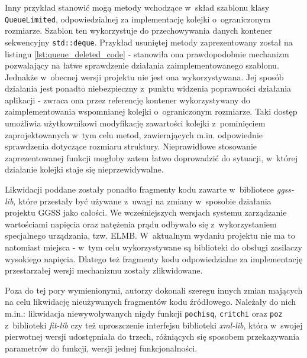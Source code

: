 


Inny przykład stanowić mogą metody wchodzące w~skład szablonu klasy \lstinline{QueueLimited}, odpowiedzialnej za implementację kolejki o~ograniczonym rozmiarze. Szablon ten wykorzystuje do przechowywania danych kontener sekwencyjny \lstinline{std::deque}. Przykład usuniętej metody zaprezentowany został na listingu \ref{lst:queue_deleted_code} - stanowiła ona prawdopodobnie mechanizm pozwalający na łatwe sprawdzenie działania zaimplementowanego szablonu. Jednakże w~obecnej wersji projektu nie jest ona wykorzystywana. Jej sposób działania jest ponadto niebezpieczny z~punktu widzenia poprawności działania aplikacji - zwraca ona przez referencję kontener wykorzystywany do zaimplementowania wspomnianej kolejki o~ograniczonym rozmiarze. Taki dostęp umożliwia użytkownikowi modyfikację zawartości kolejki z~pominięciem zaprojektowanych w~tym celu metod, zawierających m.in. odpowiednie sprawdzenia dotyczące rozmiaru struktury. Nieprawidłowe stosowanie zaprezentowanej funkcji mogłoby zatem łatwo doprowadzić do sytuacji, w~której działanie kolejki staje się nieprzewidywalne. 



Likwidacji poddane zostały ponadto fragmenty kodu zawarte w~bibliotece \emph{ggss-lib}, które przestały być używane z~uwagi na zmiany w~sposobie działania projektu GGSS jako całości. We wcześniejszych wersjach systemu zarządzanie wartościami napięcia oraz natężenia prądu odbywało się z~wykorzystaniem specjalnego urządzania, tzw. ELMB. W~aktualnym wydaniu projektu nie ma to natomiast miejsca - w~tym celu wykorzystywane są biblioteki do obsługi zasilaczy wysokiego napięcia. Dlatego też fragmenty kodu odpowiedzialne za implementację przestarzałej wersji mechanizmu zostały zlikwidowane.

Poza do tej pory wymienionymi, autorzy dokonali szeregu innych zmian mających na celu likwidację nieużywanych fragmentów kodu źródłowego. Należały do nich m.in.: likwidacja niewywoływanych nigdy funkcji \lstinline{pochisq}, \lstinline{critchi} oraz \lstinline{poz} z~biblioteki \emph{fit-lib} czy też uproszczenie interfejsu biblioteki \emph{xml-lib}, która w~swojej pierwotnej wersji udostępniała do trzech, różniących się sposobem przekazywania parametrów do funkcji, wersji jednej funkcjonalności.



